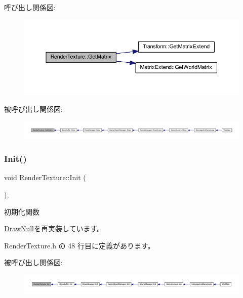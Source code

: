 呼び出し関係図\+:\nopagebreak
\begin{figure}[H]
\begin{center}
\leavevmode
\includegraphics[width=350pt]{class_render_texture_a0e9746f5cebdd088f2303e18cbc52eae_cgraph}
\end{center}
\end{figure}
被呼び出し関係図\+:
\nopagebreak
\begin{figure}[H]
\begin{center}
\leavevmode
\includegraphics[width=350pt]{class_render_texture_a0e9746f5cebdd088f2303e18cbc52eae_icgraph}
\end{center}
\end{figure}
\mbox{\label{class_render_texture_a498eb8be8672e01164b3770cdff43291}} 
\subsubsection{\texorpdfstring{Init()}{Init()}}
{\footnotesize\ttfamily void Render\+Texture\+::\+Init (\begin{DoxyParamCaption}{ }\end{DoxyParamCaption})\hspace{0.3cm}{\ttfamily [inline]}, {\ttfamily [virtual]}}



初期化関数 



\mbox{\hyperlink{class_draw_null_acd7fef3ccea1da537ac9507ffbb6dd2e}{Draw\+Null}}を再実装しています。



 Render\+Texture.\+h の 48 行目に定義があります。

被呼び出し関係図\+:
\nopagebreak
\begin{figure}[H]
\begin{center}
\leavevmode
\includegraphics[width=350pt]{class_render_texture_a498eb8be8672e01164b3770cdff43291_icgraph}
\end{center}
\end{figure}
\mbox{\label{class_render_texture_a0e55cd9b412d87dfe1f4b90f29f357c8}} 
